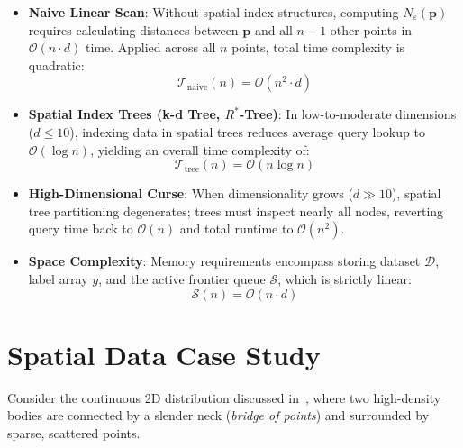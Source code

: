 \begin{itemize}
    \item \textbf{Naive Linear Scan}:
    Without spatial index structures, computing $N_\varepsilon(\mathbf{p})$ requires calculating distances between $\mathbf{p}$ and all $n-1$ other points in $\mathcal{O}(n \cdot d)$ time. Applied across all $n$ points, total time complexity is quadratic:
    \begin{equation}
        \mathcal{T}_{\mathrm{naive}}(n) = \mathcal{O}(n^2 \cdot d)
    \end{equation}

    \item \textbf{Spatial Index Trees (k-d Tree, $R^*$-Tree)}:
    In low-to-moderate dimensions ($d \le 10$), indexing data in spatial trees reduces average query lookup to $\mathcal{O}(\log n)$, yielding an overall time complexity of:
    \begin{equation}
        \mathcal{T}_{\mathrm{tree}}(n) = \mathcal{O}(n \log n)
    \end{equation}

    \item \textbf{High-Dimensional Curse}:
    When dimensionality grows ($d \gg 10$), spatial tree partitioning degenerates; trees must inspect nearly all nodes, reverting query time back to $\mathcal{O}(n)$ and total runtime to $\mathcal{O}(n^2)$.

    \item \textbf{Space Complexity}:
    Memory requirements encompass storing dataset $\mathcal{D}$, label array $y$, and the active frontier queue $\mathcal{S}$, which is strictly linear:
    \begin{equation}
        \mathcal{S}(n) = \mathcal{O}(n \cdot d)
    \end{equation}
\end{itemize}

\section{Spatial Data Case Study}
\label{sec:dm-dbscan-spatial-analysis}

Consider the continuous 2D distribution discussed in~\cite{tan2018}, where two high-density bodies are connected by a slender neck (\textit{bridge of points}) and surrounded by sparse, scattered points.

